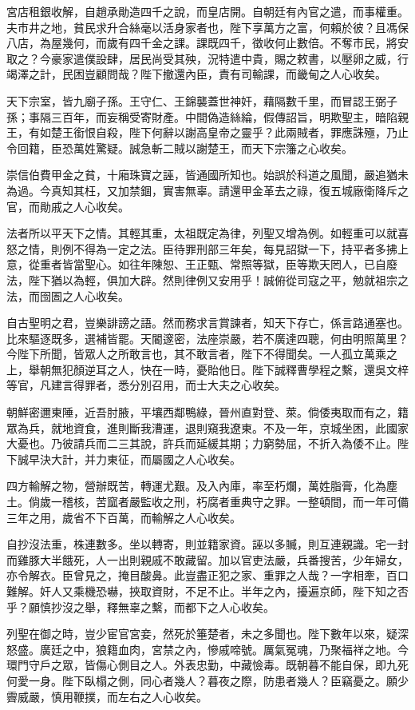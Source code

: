 \begin{pinyinscope}
宮店租銀收解，自趙承勛造四千之說，而皇店開。自朝廷有內官之遣，而事權重。夫市井之地，貧民求升合絲毫以活身家者也，陛下享萬方之富，何賴於彼？且馮保八店，為屋幾何，而歲有四千金之課。課既四千，徵收何止數倍。不奪市民，將安取之？今豪家遣僕設肆，居民尚受其殃，況特遣中貴，賜之敕書，以壓卵之威，行竭澤之計，民困豈顧問哉？陛下撤還內臣，責有司輸課，而畿甸之人心收矣。

天下宗室，皆九廟子孫。王守仁、王錦襲蓋世神奸，藉隔數千里，而冒認王弼子孫；事隔三百年，而妄稱受寄財產。中間偽造絲綸，假傳詔旨，明欺聖主，暗陷親王，有如楚王銜恨自殺，陛下何辭以謝高皇帝之靈乎？此兩賊者，罪應誅殛，乃止令回籍，臣恐萬姓驚疑。誠急斬二賊以謝楚王，而天下宗籓之心收矣。

崇信伯費甲金之貧，十廂珠寶之誣，皆通國所知也。始誤於科道之風聞，嚴追猶未為過。今真知其枉，又加禁錮，實害無辜。請還甲金革去之祿，復五城廠衛降斥之官，而勛戚之人心收矣。

法者所以平天下之情。其輕其重，太祖既定為律，列聖又增為例。如輕重可以就喜怒之情，則例不得為一定之法。臣待罪刑部三年矣，每見詔獄一下，持平者多拂上意，從重者皆當聖心。如往年陳恕、王正甄、常照等獄，臣等欺天罔人，已自廢法，陛下猶以為輕，俱加大辟。然則律例又安用乎！誠俯從司寇之平，勉就祖宗之法，而囹圄之人心收矣。

自古聖明之君，豈樂誹謗之語。然而務求言賞諫者，知天下存亡，係言路通塞也。比來驅逐既多，選補皆罷。天閽邃密，法座崇嚴，若不廣達四聰，何由明照萬里？今陛下所聞，皆眾人之所敢言也，其不敢言者，陛下不得聞矣。一人孤立萬乘之上，舉朝無犯顏逆耳之人，快在一時，憂貽他日。陛下誠釋曹學程之繫，還吳文梓等官，凡建言得罪者，悉分別召用，而士大夫之心收矣。

朝鮮密邇東陲，近吾肘腋，平壤西鄰鴨綠，晉州直對登、萊。倘倭夷取而有之，籍眾為兵，就地資食，進則斷我漕運，退則窺我遼東。不及一年，京城坐困，此國家大憂也。乃彼請兵而二三其說，許兵而延緩其期；力窮勢屈，不折入為倭不止。陛下誠早決大計，并力東征，而屬國之人心收矣。

四方輸解之物，營辦既苦，轉運尤艱。及入內庫，率至朽爛，萬姓脂膏，化為塵土。倘歲一稽核，苦窳者嚴監收之刑，朽腐者重典守之罪。一整頓間，而一年可備三年之用，歲省不下百萬，而輸解之人心收矣。

自抄沒法重，株連數多。坐以轉寄，則並籍家資。誣以多贓，則互連親識。宅一封而雞豚大半餓死，人一出則親戚不敢藏留。加以官吏法嚴，兵番搜苦，少年婦女，亦令解衣。臣曾見之，掩目酸鼻。此豈盡正犯之家、重罪之人哉？一字相牽，百口難解。奸人又乘機恐嚇，挾取資財，不足不止。半年之內，擾遍京師，陛下知之否乎？願慎抄沒之舉，釋無辜之繫，而都下之人心收矣。

列聖在御之時，豈少宦官宮妾，然死於箠楚者，未之多聞也。陛下數年以來，疑深怒盛。廣廷之中，狼籍血肉，宮禁之內，慘戚啼號。厲氣冤魂，乃聚福祥之地。今環門守戶之眾，皆傷心側目之人。外表忠勤，中藏憸毒。既朝暮不能自保，即九死何愛一身。陛下臥榻之側，同心者幾人？暮夜之際，防患者幾人？臣竊憂之。願少霽威嚴，慎用鞭撲，而左右之人心收矣。


\end{pinyinscope}
